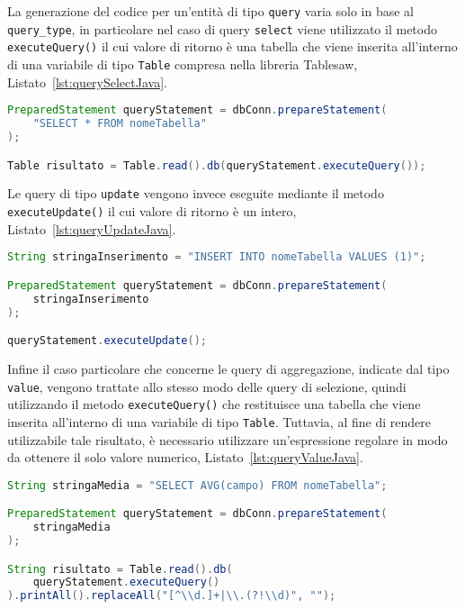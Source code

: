 La generazione del codice per un'entità di tipo \verb|query| varia solo in base al \verb|query_type|, in particolare nel caso di query \verb|select| viene utilizzato il metodo \verb|executeQuery()| il cui valore di ritorno è una tabella che viene inserita all'interno di una variabile di tipo \verb|Table| compresa nella libreria Tablesaw, Listato~\ref{lst:querySelectJava}.\\

\begin{lstlisting}[language=Java,caption={Codice Java generato per la variabile di tipo query per l'esecuzione di un'interrogazione di selezione che utilizza una stringa di testo.}, label={lst:querySelectJava}]
PreparedStatement queryStatement = dbConn.prepareStatement(
    "SELECT * FROM nomeTabella"
);

Table risultato = Table.read().db(queryStatement.executeQuery());
\end{lstlisting}

Le query di tipo \verb|update| vengono invece eseguite mediante il metodo \verb|executeUpdate()| il cui valore di ritorno è un intero, Listato~\ref{lst:queryUpdateJava}.\\

\begin{lstlisting}[language=Java,caption={Codice Java generato per la variabile di tipo query per l'esecuzione di un'interrogazione di inserimento che utilizza una variabile di tipo stringa.}, label={lst:queryUpdateJava}]
String stringaInserimento = "INSERT INTO nomeTabella VALUES (1)";

PreparedStatement queryStatement = dbConn.prepareStatement(
    stringaInserimento
);

queryStatement.executeUpdate();
\end{lstlisting}  

Infine il caso particolare che concerne le query di aggregazione, indicate dal tipo \verb|value|, vengono trattate allo stesso modo delle query di selezione, quindi utilizzando il metodo \verb|executeQuery()| che restituisce una tabella che viene inserita all'interno di una variabile di tipo \verb|Table|. Tuttavia, al fine di rendere utilizzabile tale risultato, è necessario utilizzare un'espressione regolare in modo da ottenere il solo valore numerico, Listato~\ref{lst:queryValueJava}.\\

\begin{lstlisting}[language=Java,caption={Codice Java generato per la variabile di tipo query per l'esecuzione di un'interrogazione di aggregazione che utilizza una variabile di tipo stringa.}, label={lst:queryValueJava}]
String stringaMedia = "SELECT AVG(campo) FROM nomeTabella";

PreparedStatement queryStatement = dbConn.prepareStatement(
    stringaMedia
);

String risultato = Table.read().db(
	queryStatement.executeQuery()
).printAll().replaceAll("[^\\d.]+|\\.(?!\\d)", "");
\end{lstlisting}

